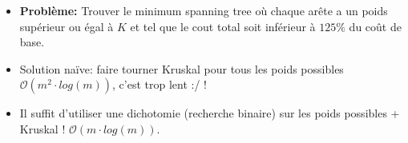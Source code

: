 \begin{frame}
    \frametitle{\problemtitle}
    \begin{itemize}
        \item<+-> \textbf{Problème:} Trouver le minimum spanning tree où chaque arête a un poids supérieur ou égal à $K$ et tel que le cout total soit inférieur à $125\%$ du coût de base.
        \item<+-> Solution na\"ive: faire tourner Kruskal pour tous les poids possibles $\mathcal O(m^2\cdot log(m))$, c'est trop lent :/ !
        \item<+-> Il suffit d'utiliser une dichotomie (recherche binaire) sur les poids possibles + Kruskal ! $\mathcal O(m \cdot log(m))$.
    \end{itemize}
    \solvestats
\end{frame}
